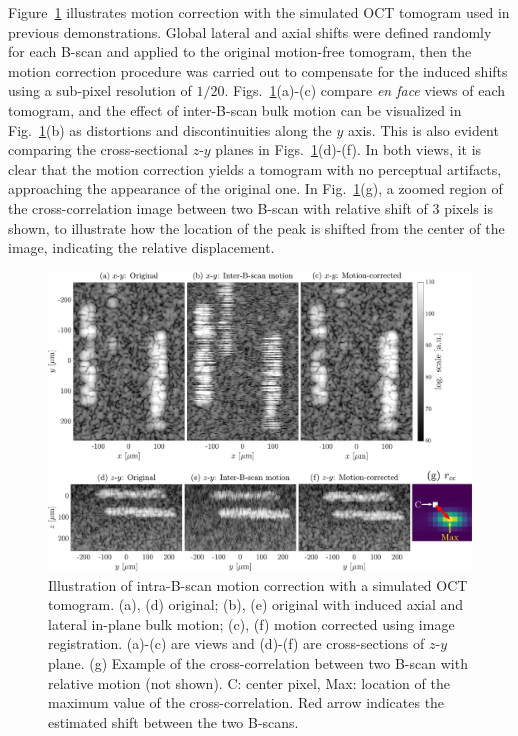 Figure~\ref{fig:MotionCor} illustrates motion correction with the simulated OCT tomogram used in previous demonstrations. Global lateral and axial shifts were defined randomly for each B-scan and applied to the original motion-free tomogram, then the motion correction procedure was carried out to compensate for the induced shifts using a sub-pixel resolution of $1/20$. Figs.~\ref{fig:MotionCor}(a)-(c) compare \textit{en face} views of each tomogram, and the effect of inter-B-scan bulk motion can be visualized in Fig.~\ref{fig:MotionCor}(b) as distortions and discontinuities along the $y$ axis. This is also evident comparing the cross-sectional $z$-$y$ planes in Figs.~\ref{fig:MotionCor}(d)-(f). In both views, it is clear that the motion correction yields a tomogram with no perceptual artifacts, approaching the appearance of the original one. In Fig.~\ref{fig:MotionCor}(g), a zoomed region of the cross-correlation image between two B-scan with relative shift of 3 pixels is shown, to illustrate how the location of the peak is shifted from the center of the image, indicating the relative displacement. 

\begin{figure}[htb!]
	\centering
	\includegraphics[width=\textwidth]{Figures/SHARP/MotionCorrection.pdf}
	\caption[Illustration of intra-B-scan motion correction with a simulated OCT tomogram.]{Illustration of intra-B-scan motion correction with a simulated OCT tomogram. (a), (d) original; (b), (e) original with induced axial and lateral in-plane bulk motion; (c), (f) motion corrected using image registration. (a)-(c) are  views and (d)-(f) are cross-sections of $z$-$y$ plane. (g) Example of the cross-correlation between two B-scan with relative motion (not shown). C: center pixel, Max: location of the maximum value of the cross-correlation. Red arrow indicates the estimated shift between the two B-scans.}
	\label{fig:MotionCor}
\end{figure}
\FloatBarrier

